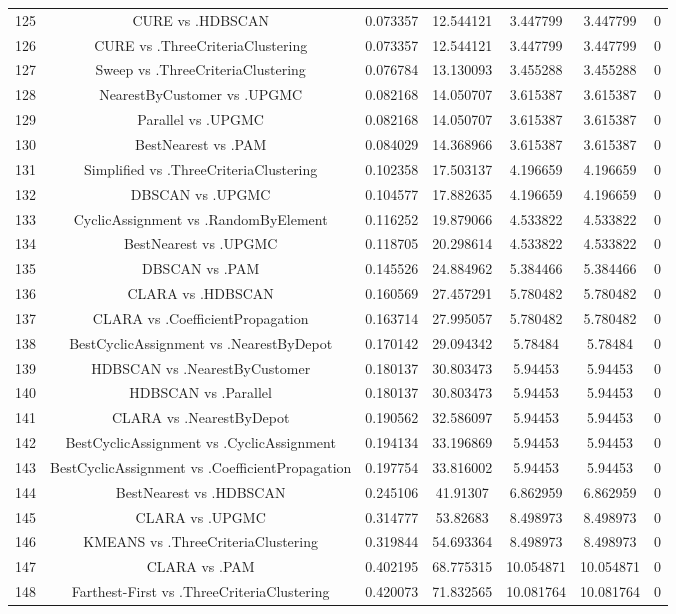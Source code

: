 \documentclass[a4paper,10pt]{article}
\begin{document}
\begin{landscape}
\begin{table}[!htp]
\begin{tabular}{ccccccc}
125&CURE vs .HDBSCAN&0.073357&12.544121&3.447799&3.447799&0\\
126&CURE vs .ThreeCriteriaClustering&0.073357&12.544121&3.447799&3.447799&0\\
127&Sweep vs .ThreeCriteriaClustering&0.076784&13.130093&3.455288&3.455288&0\\
128&NearestByCustomer vs .UPGMC&0.082168&14.050707&3.615387&3.615387&0\\
129&Parallel vs .UPGMC&0.082168&14.050707&3.615387&3.615387&0\\
130&BestNearest vs .PAM&0.084029&14.368966&3.615387&3.615387&0\\
131&Simplified vs .ThreeCriteriaClustering&0.102358&17.503137&4.196659&4.196659&0\\
132&DBSCAN vs .UPGMC&0.104577&17.882635&4.196659&4.196659&0\\
133&CyclicAssignment vs .RandomByElement&0.116252&19.879066&4.533822&4.533822&0\\
134&BestNearest vs .UPGMC&0.118705&20.298614&4.533822&4.533822&0\\
135&DBSCAN vs .PAM&0.145526&24.884962&5.384466&5.384466&0\\
136&CLARA vs .HDBSCAN&0.160569&27.457291&5.780482&5.780482&0\\
137&CLARA vs .CoefficientPropagation&0.163714&27.995057&5.780482&5.780482&0\\
138&BestCyclicAssignment vs .NearestByDepot&0.170142&29.094342&5.78484&5.78484&0\\
139&HDBSCAN vs .NearestByCustomer&0.180137&30.803473&5.94453&5.94453&0\\
140&HDBSCAN vs .Parallel&0.180137&30.803473&5.94453&5.94453&0\\
141&CLARA vs .NearestByDepot&0.190562&32.586097&5.94453&5.94453&0\\
142&BestCyclicAssignment vs .CyclicAssignment&0.194134&33.196869&5.94453&5.94453&0\\
143&BestCyclicAssignment vs .CoefficientPropagation&0.197754&33.816002&5.94453&5.94453&0\\
144&BestNearest vs .HDBSCAN&0.245106&41.91307&6.862959&6.862959&0\\
145&CLARA vs .UPGMC&0.314777&53.82683&8.498973&8.498973&0\\
146&KMEANS vs .ThreeCriteriaClustering&0.319844&54.693364&8.498973&8.498973&0\\
147&CLARA vs .PAM&0.402195&68.775315&10.054871&10.054871&0\\
148&Farthest-First vs .ThreeCriteriaClustering&0.420073&71.832565&10.081764&10.081764&0\\

\end{tabular}
\end{table}
\end{landscape}
\end{document}
